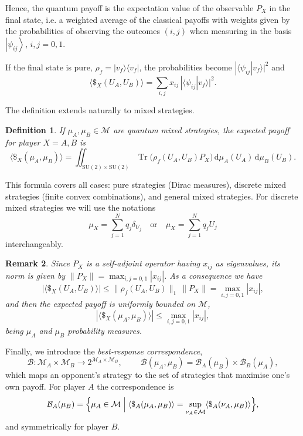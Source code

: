 \documentclass[11pt,a4paper,twoside]{article}
\DeclareMathOperator{\Tr}{Tr}
\newcommand{\SU}{\mathrm{SU}}
\newcommand{\de}{\mathrm{d}} %
\newcommand{\ket}[1]{\left| #1 \right\rangle} %
\newtheorem{definition}{Definition}
\newtheorem{rem}[definition]{Remark}
\newenvironment{remark}{\begin{rem}  \rm }{\end{rem}}
\begin{document}
Hence, the quantum payoff is the expectation value of the observable \(P_X\) in the final state, i.e. a weighted average of the classical payoffs with weights given by the probabilities of observing the outcomes \((i,j)\) when measuring in the basis $\ket{\psi_{ij}}$, $i,j=0,1$.

If the final state is pure, \(\rho_f = |v_f\rangle\langle v_f|\), the probabilities become \(|\langle \psi_{ij}|v_f\rangle|^2\) and
\begin{equation}\label{eq:payoff-puro}
\langle\$_X(U_A,U_B)\rangle = \sum_{i,j} x_{ij}\,|\langle \psi_{ij}|v_f\rangle|^2.
\end{equation}

The definition extends naturally to mixed strategies.  
\begin{definition}
If \(\mu_A,\mu_B\in\mathcal{M}\) are quantum mixed strategies, the expected payoff for player \(X=A,B\) is
\[
\langle\$_X(\mu_A,\mu_B)\rangle = 
\iint_{\SU(2)\times\SU(2)} \Tr\!\bigl(\rho_f(U_A,U_B)P_X\bigr)\,
\de\mu_A(U_A)\,\de\mu_B(U_B).
\]
\end{definition}
This formula covers all cases: pure strategies (Dirac measures), discrete mixed strategies (finite convex combinations), and general mixed strategies. For discrete mixed strategies we will use the notations
$$\mu_X=\sum_{j=1}^Nq_j\delta_{U_j}\quad\mbox{or}\quad\mu_X=\sum_{j=1}^Nq_j{U_j}$$ interchangeably.
\begin{remark}
    \rm
    Since $P_X$ is a self-adjoint operator having $x_{ij}$ as eigenvalues, its norm is given by $\|P_X\|=\max_{i,j=0,1}|x_{ij}|$. As a consequence we have
    $$|\langle\$_X(U_A,U_B)\rangle|\leq\|\rho_f(U_A,U_B)\|_1\,\|P_X\|=\max_{i,j=0,1}|x_{ij}|,$$
    and then the expected payoff is uniformly bounded on $\mathcal{M}$,
    $$|\langle\$_X(\mu_A,\mu_B)\rangle|\leq \max_{i,j=0,1}|x_{ij}|,
    $$
    being $\mu_A$ and $\mu_B$ probability measures.\end{remark}

Finally, we introduce the \emph{best-response correspondence}, $$\mathcal{B}:\mathcal{M}_A\times\mathcal{M}_B\to 2^{\mathcal{M}_A\times\mathcal{M}_B},\ \qquad
\mathcal{B}(\mu_A,\mu_B) = \mathcal{B}_A(\mu_B) \times \mathcal{B}_B(\mu_A),
$$
which maps an opponent's strategy to the set of strategies that maximise one's own payoff.
For player \(A\) the correspondence is
\[
\mathcal{B}_A(\mu_B)=\Bigl\{
\mu_A\in\mathcal{M}\; \Big|\; 
\langle\$_A(\mu_A,\mu_B)\rangle = \sup_{\nu_A\in\mathcal{M}}\langle\$_A(\nu_A,\mu_B)\rangle
\Bigr\},
\]
and symmetrically for player \(B\).  
\end{document}
